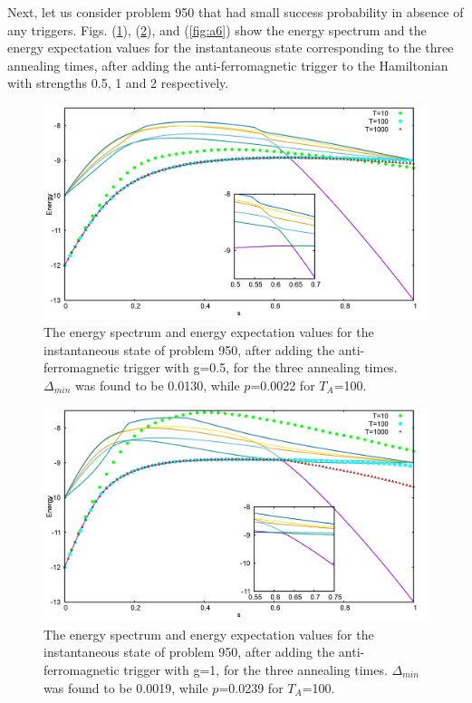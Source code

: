 \documentclass[../main.tex]{subfiles}
\begin{document}
Next, let us consider problem 950 that had small success probability in absence of any triggers. Figs. (\ref{fig:a4}), (\ref{fig:a5}), and (\ref{fig:a6}) show the energy spectrum and the energy expectation values for the instantaneous state corresponding to the three annealing times, after adding the anti-ferromagnetic trigger to the Hamiltonian with strengths 0.5, 1 and 2 respectively. 


\begin{figure}[H]
\centering 
\includegraphics[scale=0.24]{950_s12_A_g0.png}
\caption{The energy spectrum and energy expectation values for the instantaneous state of problem 950, after adding the anti-ferromagnetic trigger with g=0.5, for the three annealing times. $\Delta_{min}$ was found to be 0.0130, while $p$=0.0022 for $T_A$=100. }
\label{fig:a4}
\end{figure}
\begin{figure}[H]
\centering 
\includegraphics[scale=0.24]{950_s12_A_g1.png}
\caption{The energy spectrum and energy expectation values for the instantaneous state of problem 950, after adding the anti-ferromagnetic trigger with g=1, for the three annealing times. $\Delta_{min}$ was found to be 0.0019, while $p$=0.0239 for $T_A$=100. }
\label{fig:a5}
\end{figure}
\end{document}
